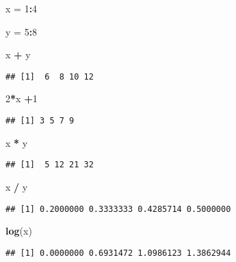 \documentclass[]{article}
\newenvironment{Shaded}{\begin{snugshade}}{\end{snugshade}}
\newcommand{\KeywordTok}[1]{\textcolor[rgb]{0.13,0.29,0.53}{\textbf{#1}}}
\newcommand{\DecValTok}[1]{\textcolor[rgb]{0.00,0.00,0.81}{#1}}
\newcommand{\StringTok}[1]{\textcolor[rgb]{0.31,0.60,0.02}{#1}}
\newcommand{\OperatorTok}[1]{\textcolor[rgb]{0.81,0.36,0.00}{\textbf{#1}}}
\newcommand{\NormalTok}[1]{#1}
\begin{document}
\begin{Shaded}
\begin{Highlighting}[]
\NormalTok{x =}\StringTok{ }\DecValTok{1}\OperatorTok{:}\DecValTok{4}

\NormalTok{y =}\StringTok{ }\DecValTok{5}\OperatorTok{:}\DecValTok{8}

\NormalTok{x }\OperatorTok{+}\StringTok{ }\NormalTok{y}
\end{Highlighting}
\end{Shaded}

\begin{verbatim}
## [1]  6  8 10 12
\end{verbatim}

\begin{Shaded}
\begin{Highlighting}[]
\DecValTok{2}\OperatorTok{*}\NormalTok{x }\OperatorTok{+}\DecValTok{1}
\end{Highlighting}
\end{Shaded}

\begin{verbatim}
## [1] 3 5 7 9
\end{verbatim}

\begin{Shaded}
\begin{Highlighting}[]
\NormalTok{x }\OperatorTok{*}\StringTok{ }\NormalTok{y}
\end{Highlighting}
\end{Shaded}

\begin{verbatim}
## [1]  5 12 21 32
\end{verbatim}

\begin{Shaded}
\begin{Highlighting}[]
\NormalTok{x }\OperatorTok{/}\StringTok{ }\NormalTok{y}
\end{Highlighting}
\end{Shaded}

\begin{verbatim}
## [1] 0.2000000 0.3333333 0.4285714 0.5000000
\end{verbatim}

\begin{Shaded}
\begin{Highlighting}[]
\KeywordTok{log}\NormalTok{(x)}
\end{Highlighting}
\end{Shaded}

\begin{verbatim}
## [1] 0.0000000 0.6931472 1.0986123 1.3862944
\end{verbatim}
\end{document}
